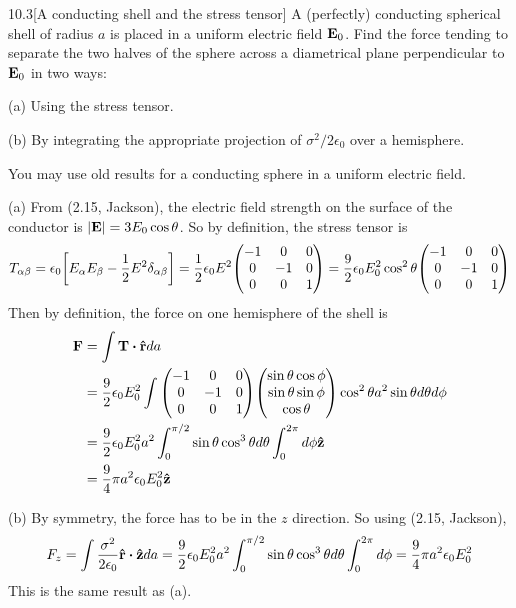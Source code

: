 \documentclass[12pt]{article}
\begin{document}
\begin{problem}{10.3}[A conducting shell and the stress tensor]
A (perfectly) conducting spherical shell of radius $a$ is placed in a uniform
electric field $\vb{E}_0$. Find the force tending to separate the two halves of
the sphere across a diametrical plane perpendicular to $\vb{E}_0$ in two ways:

(a) Using the stress tensor.

(b) By integrating the appropriate projection of $\sigma^2 /2\epsilon_0$ over a
hemisphere.

You may use old results for a conducting sphere in a uniform electric field.
\begin{solution}
(a) From (2.15, Jackson), the electric field strength on the surface of the 
conductor is $\abs{\vb{E}}=3E_0\cos\theta$. So by definition, the stress tensor
is
\begin{equation}
    T_{\alpha\beta}=\epsilon_0\qty[E_\alpha E_\beta-\frac12E^2\delta_{\alpha\beta}] 
    =\frac12\epsilon_0E^2\mqty(-1&0&0\\0&-1&0\\0&0&1)
    =\frac92\epsilon_0E_0^2\cos^2\theta\mqty(-1&0&0\\0&-1&0\\0&0&1)
\end{equation}
Then by definition, the force on one hemisphere of the shell is
\begin{align}
    \vb{F}
    &=\int \vb{T}\vdot\rhat da\notag\\
    &=\frac92\epsilon_0E_0^2\int\mqty(-1&0&0\\0&-1&0\\0&0&1)
    \mqty(\sin\theta\cos\phi\\\sin\theta\sin\phi\\\cos\theta)\cos^2\theta
    a^2\sin\theta d\theta d\phi\notag\\
    &=\frac92\epsilon_0E_0^2a^2\int_0^{\pi/2}\sin\theta\cos^3\theta
    d\theta\int_0^{2\pi}d\phi\zhat\notag\\
    &=\frac94\pi a^2\epsilon_0E_0^2\zhat
\end{align}

(b) By symmetry, the force has to be in the $z$ direction. So using (2.15,
Jackson),
\begin{align}
    F_z=\int\frac{\sigma^2}{2\epsilon_0}\rhat\vdot\zhat da 
    =\frac92\epsilon_0E_0^2a^2\int_0^{\pi/2}\sin\theta\cos^3\theta
    d\theta\int_0^{2\pi}d\phi=\frac94\pi a^2\epsilon_0E_0^2
\end{align}
This is the same result as (a).
\end{solution}
\end{problem}
\end{document}
